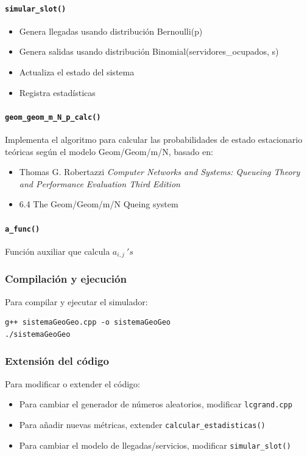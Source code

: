 \documentclass{article}
\begin{document}
\paragraph{\texttt{simular\_slot()}}
\begin{itemize}
    \item Genera llegadas usando distribución Bernoulli(p)
    \item Genera salidas usando distribución Binomial(servidores\_ocupados, s)
    \item Actualiza el estado del sistema
    \item Registra estadísticas
\end{itemize}

\paragraph{\texttt{geom\_geom\_m\_N\_p\_calc()}}
Implementa el algoritmo para calcular las probabilidades de estado estacionario teóricas según el modelo Geom/Geom/m/N, basado en:
\begin{itemize}
    \item Thomas G. Robertazzi \textit{Computer Networks and Systems: Queueing Theory and Performance Evaluation Third Edition}
    \item 6.4 The Geom/Geom/m/N Queing system
\end{itemize}

\paragraph{\texttt{a\_func()}}
Función auxiliar que calcula $a_{i,j} \ 's$

\subsubsection{Compilación y ejecución}

Para compilar y ejecutar el simulador:

\begin{verbatim}
g++ sistemaGeoGeo.cpp -o sistemaGeoGeo 
./sistemaGeoGeo
\end{verbatim}

\subsubsection{Extensión del código}

Para modificar o extender el código:
\begin{itemize}
    \item Para cambiar el generador de números aleatorios, modificar \texttt{lcgrand.cpp}
    \item Para añadir nuevas métricas, extender \texttt{calcular\_estadisticas()}
    \item Para cambiar el modelo de llegadas/servicios, modificar \texttt{simular\_slot()}
\end{itemize}
\end{document}
